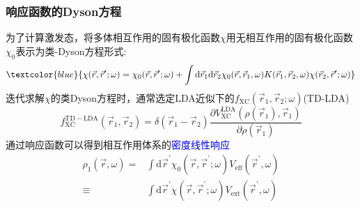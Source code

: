 \frame
{
	\frametitle{响应函数的\textrm{Dyson}方程}
	为了计算激发态，将多体相互作用的固有极化函数$\chi$用无相互作用的固有极化函数$\chi_0$表示为类-\textrm{Dyson}方程形式:
\begin{displaymath}
	\textcolor{blue}{\chi(\vec r,\vec r^{\prime};\omega)=\chi_0(\vec r,\vec r^{\prime};\omega)+\int\mathrm{d}\vec r_1\mathrm{d}\vec r_2\chi_0(\vec r,\vec r_1,\omega)K(\vec r_1,\vec r_2,\omega)\chi(\vec r_2,\vec r^{\prime};\omega)}
\end{displaymath}
{\fontsize{7.8pt}{4.2pt}}
迭代求解$\chi$的类\textrm{Dyson}方程时，通常选定\textrm{LDA}近似下的$f_{\mathrm{XC}}(\vec r_1,\vec r_2;\omega)$(\textrm{TD-LDA})
\begin{displaymath}
	f_{\mathrm{XC}}^{\mathrm{TD-LDA}}(\vec r_1,\vec r_2)=\delta(\vec r_1-\vec r_2)\frac{\partial V_{\mathrm{XC}}^{\mathrm{LDA}}(\rho(\vec r_1),\vec r_1)}{\partial\rho(\vec r_1)}
\end{displaymath}
通过响应函数可以得到相互作用体系的\textcolor{blue}{密度线性响应}
\begin{displaymath}
	\begin{aligned}
		\rho_1(\vec r,\omega)=&\int\mathrm{d}\vec r^{\prime}\chi_0(\vec r,\vec r^{\prime};\omega)V_{\mathrm{eff}}(\vec r^{\prime},\omega)\\
	\equiv&\int\mathrm{d}\vec r^{\prime}\chi(\vec r,\vec r^{\prime};\omega)V_{\mathrm{ext}}(\vec r^{\prime},\omega)
	\end{aligned}
\end{displaymath}
}

